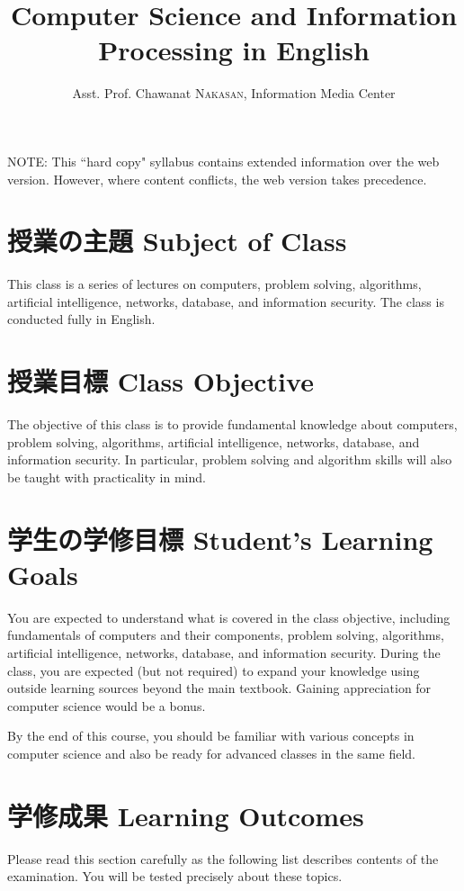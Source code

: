 \documentclass{article}
\title{Computer Science and Information Processing \newline
[情報の科学] in English}
\author{Asst. Prof. Chawanat \textsc{Nakasan}, Information Media Center}
\date{}
\begin{document}
\maketitle

\noindent
NOTE: This ``hard copy" syllabus contains extended information over the web version. However, where content conflicts, the web version takes precedence.

\section{授業の主題 Subject of Class}
This class is a series of lectures on computers, problem solving, algorithms, artificial intelligence, networks, database, and information security.
The class is conducted fully in English.

\section{授業目標 Class Objective}
The objective of this class is to provide fundamental knowledge about computers, problem solving, algorithms, artificial intelligence, networks, database, and information security.
In particular, problem solving and algorithm skills will also be taught with practicality in mind.

\section{学生の学修目標 Student's Learning Goals}
You are expected to understand what is covered in the class objective, including fundamentals of computers and their components, problem solving, algorithms, artificial intelligence, networks, database, and information security. During the class, you are expected (but not required) to expand your knowledge using outside learning sources beyond the main textbook. Gaining appreciation for computer science would be a bonus.

By the end of this course, you should be familiar with various concepts in computer science and also be ready for advanced classes in the same field.

\section{学修成果 Learning Outcomes}
\label{goals}
Please read this section carefully as the following list describes contents of the examination. You will be tested precisely about these topics.
\end{document}
